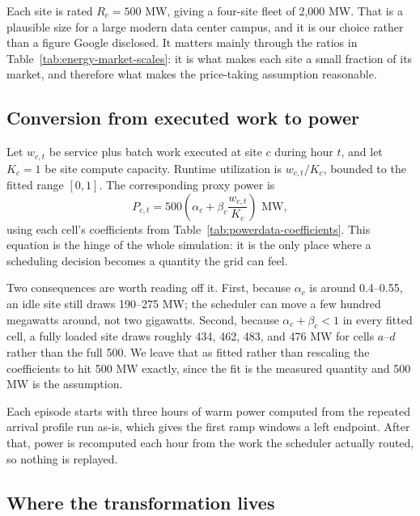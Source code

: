 ﻿\documentclass[12pt]{article}
\begin{document}
Each site is rated \(R_c=500\) MW, giving a four-site fleet of 2,000 MW. That is
a plausible size for a large modern data center campus, and it is our choice
rather than a figure Google disclosed. It matters mainly through the ratios in
Table~\ref{tab:energy-market-scales}: it is what makes each site a small
fraction of its market, and therefore what makes the price-taking assumption
reasonable.

\subsection{Conversion from executed work to power}
\label{subsec:transform-runtime-power}

Let \(w_{c,t}\) be service plus batch work executed at site \(c\) during hour
\(t\), and let \(K_c=1\) be site compute capacity. Runtime utilization is
\(w_{c,t}/K_c\), bounded to the fitted range \([0,1]\). The corresponding proxy
power is
\begin{equation}
  P_{c,t}
  =
  500
  \left(
    \alpha_c + \beta_c \frac{w_{c,t}}{K_c}
  \right)
  \text{ MW},
  \label{eq:transform-runtime-power}
\end{equation}
using each cell's coefficients from Table~\ref{tab:powerdata-coefficients}.
This equation is the hinge of the whole simulation: it is the only place where a
scheduling decision becomes a quantity the grid can feel.

Two consequences are worth reading off it. First, because \(\alpha_c\) is around
0.4--0.55, an idle site still draws 190--275 MW; the scheduler can move a few
hundred megawatts around, not two gigawatts. Second, because
\(\alpha_c+\beta_c<1\) in every fitted cell, a fully loaded site draws roughly
434, 462, 483, and 476 MW for cells \(a\)--\(d\) rather than the full 500. We
leave that as fitted rather than rescaling the coefficients to hit 500 MW
exactly, since the fit is the measured quantity and 500 MW is the assumption.

Each episode starts with three hours of warm power computed from the repeated
arrival profile run as-is, which gives the first ramp windows a left endpoint.
After that, power is recomputed each hour from the work the scheduler actually
routed, so nothing is replayed.

\subsection{Where the transformation lives}
\label{subsec:transform-factory}
\end{document}
